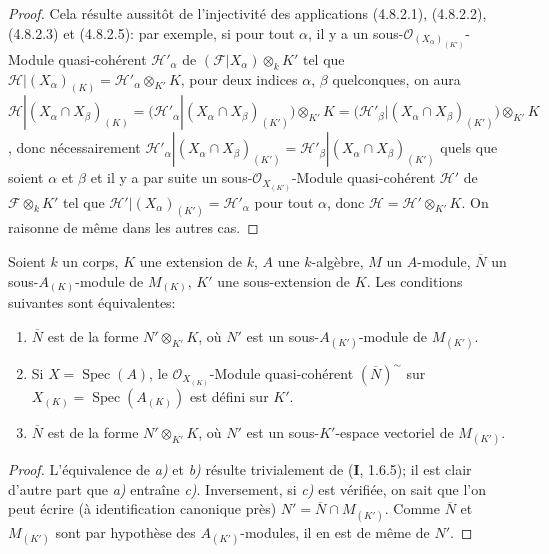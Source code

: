 \begin{proof}
Cela résulte aussitôt de l'injectivité des applications (4.8.2.1), (4.8.2.2),
(4.8.2.3) et (4.8.2.5): par exemple, si pour tout $\alpha$, il y a un
sous-$\mathcal O_{(X_\alpha)_{(K')}}$-Module quasi-cohérent
$\mathscr H'_\alpha$ de $(\mathscr F|X_\alpha)\otimes_kK'$ tel que
$\mathscr H|(X_\alpha)_{(K)}=\mathscr H'_\alpha\otimes_{K'}K$, pour deux
indices $\alpha$, $\beta$ quelconques, on aura
$\mathscr H|(X_\alpha\cap X_\beta)_{(K)}
=\bigl(\mathscr H'_\alpha|(X_\alpha\cap X_\beta)_{(K')}\bigr)
 \otimes_{K'}K
=\bigl(\mathscr H'_\beta|(X_\alpha\cap X_\beta)_{(K')}\bigr)
 \otimes_{K'}K$,
donc nécessairement
$\mathscr H'_\alpha|(X_\alpha\cap X_\beta)_{(K')}
=\mathscr H'_\beta|(X_\alpha\cap X_\beta)_{(K')}$ quels que soient
$\alpha$ et $\beta$ et il y a par suite un sous-$\mathcal O_{X_{(K')}}$-Module
quasi-cohérent $\mathscr H'$ de $\mathscr F\otimes_kK'$ tel que
$\mathscr H'|(X_\alpha)_{(K')}=\mathscr H'_\alpha$ pour tout $\alpha$, donc
$\mathscr H=\mathscr H'\otimes_{K'}K$. On raisonne de même dans les autres
cas.
\end{proof}

\begin{lemma}[4.8.6]
\label{IV.2.4.8.6-fr}
Soient $k$ un corps, $K$ une extension de $k$, $A$ une $k$-algèbre, $M$ un
$A$-module, $\overline N$ un sous-$A_{(K)}$-module de $M_{(K)}$, $K'$ une
sous-extension de $K$. Les conditions suivantes sont équivalentes:
\begin{enumerate}
\item[\textup{a)}] $\overline N$ est de la forme $N'\otimes_{K'}K$, où $N'$ est un
sous-$A_{(K')}$-module de $M_{(K')}$. 
\item[\textup{b)}] Si $X=\operatorname{Spec}(A)$, le
$\mathcal O_{X_{(K)}}$-Module quasi-cohérent $(\overline N)^{\sim}$ sur
$X_{(K)}=\operatorname{Spec}(A_{(K)})$ est défini sur $K'$.
\item[\textup{c)}] $\overline N$ est de la forme $N'\otimes_{K'}K$, où $N'$ est un
sous-$K'$-espace vectoriel de $M_{(K')}$. 
\end{enumerate}
\end{lemma}


\begin{proof}
L'équivalence de \emph{a)} et \emph{b)} résulte trivialement de (\textbf{I}, 1.6.5); il est clair
d'autre part que \emph{a)} entraîne \emph{c)}. Inversement, si \emph{c)} est vérifiée, on sait que
l'on peut écrire (à identification canonique près)
$N'=\overline N\cap M_{(K')}$. Comme $\overline N$ et $M_{(K')}$ sont par
hypothèse des $A_{(K')}$-modules, il en est de même de $N'$.
\end{proof}

